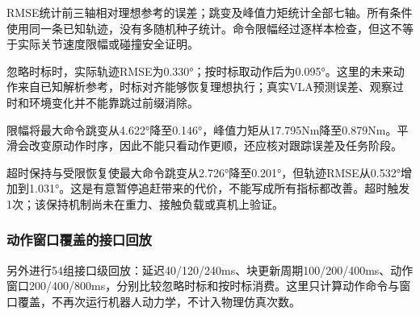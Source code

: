 RMSE统计前三轴相对理想参考的误差；跳变及峰值力矩统计全部七轴。所有条件使用同一条已知轨迹，没有多随机种子统计。命令限幅经过逐样本检查，但这不等于实际关节速度限幅或碰撞安全证明。


忽略时标时，实际轨迹RMSE为0.330°；按时标取动作后为0.095°。这里的未来动作来自已知解析参考，时标对齐能够恢复理想执行；真实VLA预测误差、观察过时和环境变化并不能靠跳过前缀消除。


限幅将最大命令跳变从4.622°降至0.146°，峰值力矩从17.795Nm降至0.879Nm。平滑会改变原动作时序，因此不能只看动作更顺，还应核对跟踪误差及任务阶段。


超时保持与受限恢复使最大命令跳变从2.726°降至0.201°，但轨迹RMSE从0.532°增加到1.031°。这是有意暂停追赶带来的代价，不能写成所有指标都改善。超时触发1次；该保持机制尚未在重力、接触负载或真机上验证。

\subsubsection{动作窗口覆盖的接口回放}\label{s16-detail-2}

另外进行54组接口级回放：延迟40/120/240ms、块更新周期100/200/400ms、动作窗口200/400/800ms，分别比较忽略时标和按时标消费。这里只计算动作命令与窗口覆盖，不再次运行机器人动力学，不计入物理仿真次数。

